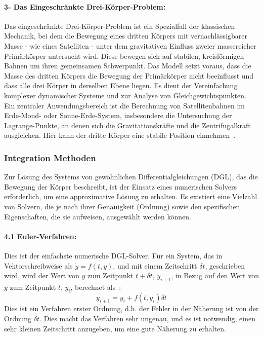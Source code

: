 \documentclass[a4paper,12pt,twoside]{article}
\begin{document}
\paragraph{3- Das Eingeschränkte Drei-Körper-Problem:}
Das eingeschränkte Drei-Körper-Problem ist ein Spezialfall der klassischen Mechanik, bei dem die Bewegung eines dritten Körpers mit vernachlässigbarer Masse - wie eines Satelliten - unter dem gravitativen Einfluss zweier massereicher Primärkörper untersucht wird. Diese bewegen sich auf stabilen, kreisförmigen Bahnen um ihren gemeinsamen Schwerpunkt.
Das Modell setzt voraus, dass die Masse des dritten Körpers die Bewegung der Primärkörper nicht beeinflusst und dass alle drei Körper in derselben Ebene liegen. Es dient der Vereinfachung komplexer dynamischer Systeme und zur Analyse von Gleichgewichtspunkten.
Ein zentraler Anwendungsbereich ist die Berechnung von Satellitenbahnen im Erde-Mond- oder Sonne-Erde-System, insbesondere die Untersuchung der Lagrange-Punkte, an denen sich die Gravitationskräfte und die Zentrifugalkraft ausgleichen. Hier kann der dritte Körper eine stabile Position einnehmen~\cite{Weber}.

\subsubsection{Integration Methoden}
Zur Lösung des Systems von gewöhnlichen Differentialgleichungen (DGL), das die Bewegung der Körper beschreibt, ist der Einsatz eines numerischen Solvers erforderlich, um eine approximative Lösung zu erhalten. Es existiert eine Vielzahl von Solvern, die je nach ihrer Genauigkeit (Ordnung) sowie den spezifischen Eigenschaften, die sie aufweisen, ausgewählt werden können.

\paragraph{4.1 Euler-Verfahren: }
Dies ist der einfachste numerische DGL-Solver. Für ein System, das in Vektorschreibweise als $ \dot{y} = f(t, y) $, und mit einem Zeitschritt $\delta t$, geschrieben wird, wird der Wert von $y$ zum Zeitpunkt $t + \delta t$, $y_{i+1}$, in Bezug auf den Wert von $y$ zum Zeitpunkt $t$, $y_i$, berechnet als~\cite{Zhou&Long2018}:
\begin{equation*}
    y_{i+1} = y_i + f(t, y_i)\delta t
\end{equation*}
Dies ist ein Verfahren erster Ordnung, d.h. der Fehler in der Näherung ist von der Ordnung $\delta t$. Dies macht das Verfahren sehr ungenau, und es ist notwendig, einen sehr kleinen Zeitschritt anzugeben, um eine gute Näherung zu erhalten.
\end{document}
